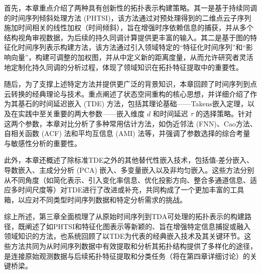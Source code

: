 首先，本章重点介绍了两种具有创新性的拓扑表示构建策略。其一是基于持续同调的时间序列倾斜处理方法 (PHTSI)，该方法通过对预处理得到的二维点云子序列施加时间相关的线性加权（时间倾斜），旨在增强时序依赖信息的捕获，并从多个结构视角审视数据，为后续的持久同调计算提供更丰富的输入。其二是基于图的特征化时间序列表示构建方法，该方法通过引入领域特定的“特征化时间序列”和“影响向量”，构建可调整的加权图，并从中定义新的距离度量，从而允许研究者灵活地定制化持久同调的分析过程，体现了领域知识在拓扑特征提取中的重要性。

随后，为了支撑上述特定方法并提供更广泛的背景知识，本章回顾了时间序列到点云转换的经典理论与技术。重点阐述了状态空间重构的核心思想，并详细介绍了作为其基石的时间延迟嵌入 (TDE) 方法，包括其理论基础——Takens嵌入定理，以及在实践中至关重要的两大参数——嵌入维度 $d$ 和时间延迟 $\tau$ 的选择策略。针对这两个参数，本章对比分析了多种常用估计方法，如伪近邻法 (FNN)、Cao方法、自相关函数 (ACF) 法和平均互信息 (AMI) 法等，并强调了参数选择的综合考量与敏感性分析的重要性。

此外，本章还概述了除标准TDE之外的其他替代性嵌入技术，包括值-差分嵌入、导数嵌入、主成分分析 (PCA) 嵌入、多变量嵌入以及非均匀嵌入。这些方法分别从不同角度（如简化表示、引入变化率信息、优化投影方向、整合多通道信息、适应多时间尺度等）对TDE进行了改进或补充，共同构成了一个更加丰富的工具箱，以应对不同类型时间序列数据和特定分析需求的挑战。

综上所述，第三章全面梳理了从原始时间序列到TDA可处理的拓扑表示的构建路径，既阐述了如PHTSI和特征化图表示等新颖的、旨在增强特定信息捕捉或融入领域知识的方法，也系统回顾了以TDE为代表的经典嵌入技术及其关键环节。这些方法共同为从时间序列数据中有效提取和分析其拓扑结构提供了多样化的途径，是连接原始观测数据与后续拓扑特征提取和分类任务（将在第四章详细讨论）的关键桥梁。